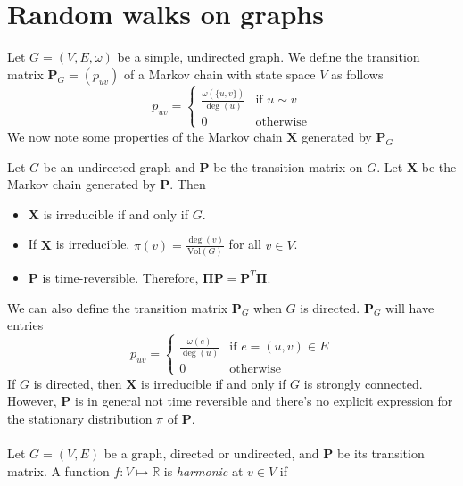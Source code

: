 \section{Random walks on graphs}
\label{sec:random-walks-graphs}
Let $G = (V,E,\omega)$ be a simple, undirected graph. We define the transition
matrix $\mathbf{P}_G = (p_{uv})$ of a Markov chain with state space $V$ as follows
\begin{equation}
  \label{eq:20}
  p_{uv} = \begin{cases}
    \tfrac{\omega(\{u,v\})}{\deg(u)} & \text{if $u \sim v$} \\
    0 & \text{otherwise}
  \end{cases}
\end{equation}
We now note some properties of the Markov chain $\mathbf{X}$ generated
by $\mathbf{P}_G$
\begin{proposition}
  \label{prop:15}
  Let $G$ be an undirected graph and $\mathbf{P}$ be the transition
  matrix on $G$. Let $\mathbf{X}$ be the Markov chain generated by
  $\mathbf{P}$. Then 
\begin{itemize}
\item $\mathbf{X}$ is irreducible if and only if $G$.
\item If $\mathbf{X}$ is irreducible, $\pi(v) =
  \tfrac{\deg(v)}{\mathrm{Vol}(G)}$ for all $v \in V$.
\item $\mathbf{P}$ is time-reversible. Therefore, $\bm{\Pi}\mathbf{P} = \mathbf{P}^{T}\bm{\Pi}$.
\end{itemize}
\end{proposition}
%
We can also define the transition matrix $\mathbf{P}_G$ when $G$ is
directed. $\mathbf{P}_G$ will have entries
\begin{equation}
  \label{eq:18}
  p_{uv} = \begin{cases}
    \tfrac{\omega(e)}{\deg(u)} & \text{if $e = (u,v) \in E$} \\
    0 & \text{otherwise}
  \end{cases}
\end{equation}
If $G$ is directed, then $\mathbf{X}$ is irreducible if and only if
$G$ is strongly connected. However, $\mathbf{P}$ is in general not
time reversible and there's no explicit expression for the
stationary distribution $\pi$ of $\mathbf{P}$. \\ \\
%
%
\noindent Let $G = (V,E)$ be a graph, directed or undirected, and $\mathbf{P}$
be its transition matrix. A function $f \colon V \mapsto \mathbb{R}$
is {\em harmonic} at $v \in V$ if
